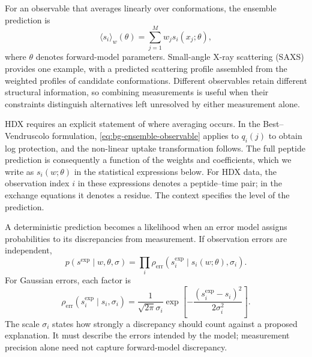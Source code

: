 For an observable that averages linearly over conformations, the ensemble prediction is
\begin{equation}
    \langle s_i\rangle_w(\theta)
    =\sum_{j=1}^{M}w_js_i(x_j;\theta),
    \label{eq:bg-ensemble-observable}
\end{equation}
where $\theta$ denotes forward-model parameters. Small-angle X-ray scattering (SAXS) provides one example, with a predicted scattering profile assembled from the weighted profiles of candidate conformations.\supercite{bmsb2012ch13} Different observables retain different structural information, so combining measurements is useful when their constraints distinguish alternatives left unresolved by either measurement alone.

HDX requires an explicit statement of where averaging occurs. In the Best--Vendruscolo formulation, \cref{eq:bg-ensemble-observable} applies to $q_i(j)$ to obtain log protection, and the non-linear uptake transformation follows. The full peptide prediction is consequently a function of the weights and coefficients, which we write as $s_i(w;\theta)$ in the statistical expressions below. For HDX data, the observation index $i$ in these expressions denotes a peptide--time pair; in the exchange equations it denotes a residue. The context specifies the level of the prediction.

A deterministic prediction becomes a likelihood when an error model assigns probabilities to its discrepancies from measurement. If observation errors are independent,
\begin{equation}
    p(s^{\text{exp}}\mid w,\theta,\sigma)
    =\prod_i\rho_{\text{err}}\!\left(
    s_i^{\text{exp}}\mid s_i(w;\theta),\sigma_i\right).
    \label{eq:bg-likelihood}
\end{equation}
For Gaussian errors, each factor is
\begin{equation}
    \rho_{\text{err}}(s_i^{\text{exp}}\mid s_i,\sigma_i)
    =\frac{1}{\sqrt{2\pi}\sigma_i}
    \exp\!\left[-\frac{(s_i^{\text{exp}}-s_i)^2}{2\sigma_i^2}\right].
    \label{eq:bg-gaussian-error}
\end{equation}
The scale $\sigma_i$ states how strongly a discrepancy should count against a proposed explanation. It must describe the errors intended by the model; measurement precision alone need not capture forward-model discrepancy.\supercite{bmsb2012ch12}


